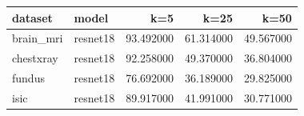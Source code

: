 \begin{tabular}{llrrr}
\toprule
dataset & model & k=5 & k=25 & k=50 \\
\midrule
brain_mri & resnet18 & 93.492000 & 61.314000 & 49.567000 \\
chestxray & resnet18 & 92.258000 & 49.370000 & 36.804000 \\
fundus & resnet18 & 76.692000 & 36.189000 & 29.825000 \\
isic & resnet18 & 89.917000 & 41.991000 & 30.771000 \\
\bottomrule
\end{tabular}
